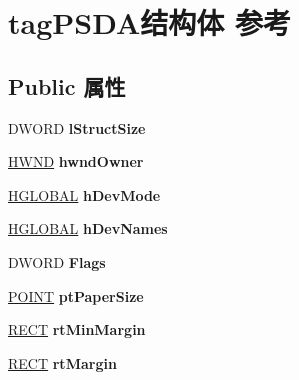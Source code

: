 \hypertarget{structtag_p_s_d_a}{}\section{tag\+P\+S\+D\+A结构体 参考}
\label{structtag_p_s_d_a}
\subsection*{Public 属性}
\begin{DoxyCompactItemize}
\item 
\mbox{\label{structtag_p_s_d_a_aa896e893da234b5177833c37d7292c99}} 
D\+W\+O\+RD {\bfseries l\+Struct\+Size}
\item 
\mbox{\label{structtag_p_s_d_a_ac7855becb864dfc1ed9ea319c14a1ad2}} 
\hyperlink{interfacevoid}{H\+W\+ND} {\bfseries hwnd\+Owner}
\item 
\mbox{\label{structtag_p_s_d_a_a8eceff839a48622df3d3ae27cbfc9b27}} 
\hyperlink{interfacevoid}{H\+G\+L\+O\+B\+AL} {\bfseries h\+Dev\+Mode}
\item 
\mbox{\label{structtag_p_s_d_a_ab509165ab618243a2c50d86b43baa51b}} 
\hyperlink{interfacevoid}{H\+G\+L\+O\+B\+AL} {\bfseries h\+Dev\+Names}
\item 
\mbox{\label{structtag_p_s_d_a_a925e6ffc24ba925d148078b871575806}} 
D\+W\+O\+RD {\bfseries Flags}
\item 
\mbox{\label{structtag_p_s_d_a_a7b2e3d999c4a1763f8688a239d60cb9e}} 
\hyperlink{structtag_p_o_i_n_t}{P\+O\+I\+NT} {\bfseries pt\+Paper\+Size}
\item 
\mbox{\label{structtag_p_s_d_a_ae6ea756bff32943fd0b924c5f9d2ebc5}} 
\hyperlink{structtag_r_e_c_t}{R\+E\+CT} {\bfseries rt\+Min\+Margin}
\item 
\mbox{\label{structtag_p_s_d_a_a2199b3e2cb3e5ebfee7a32fe9aef6000}} 
\hyperlink{structtag_r_e_c_t}{R\+E\+CT} {\bfseries rt\+Margin}
\item 
\mbox{\label{structtag_p_s_d_a_a391fa1c32b860963f5e6180ae72067a8}} 

\end{DoxyCompactItemize}
